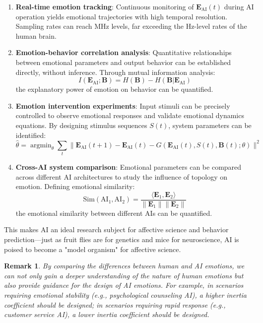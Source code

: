 \documentclass[12pt,a4paper]{article}
\theoremstyle{plain}
\newtheorem{remark}{Remark}[section]
\newcommand{\ve}[1]{\bm{#1}}                    %
\newcommand{\Evec}{\ve{E}}                        %
\newcommand{\Bvec}{\ve{B}}                        %
\DeclareMathOperator*{\argmin}{argmin}
\begin{document}
\begin{enumerate}
    \item \textbf{Real-time emotion tracking}: Continuous monitoring of $\Evec_{\text{AI}}(t)$ during AI operation yields emotional trajectories with high temporal resolution. Sampling rates can reach MHz levels, far exceeding the Hz-level rates of the human brain.
    \item \textbf{Emotion-behavior correlation analysis}: Quantitative relationships between emotional parameters and output behavior can be established directly, without inference. Through mutual information analysis:
    \begin{equation}
    I(\Evec_{\text{AI}}; \Bvec) = H(\Bvec) - H(\Bvec | \Evec_{\text{AI}})
    \end{equation}
    the explanatory power of emotion on behavior can be quantified.
    \item \textbf{Emotion intervention experiments}: Input stimuli can be precisely controlled to observe emotional responses and validate emotional dynamics equations. By designing stimulus sequences $S(t)$, system parameters can be identified:
    \begin{equation}
    \hat{\theta} = \argmin_{\theta} \sum_t \| \Evec_{\text{AI}}(t+1) - \Evec_{\text{AI}}(t) - G(\Evec_{\text{AI}}(t), S(t), \Bvec(t); \theta) \|^2
    \end{equation}
    \item \textbf{Cross-AI system comparison}: Emotional parameters can be compared across different AI architectures to study the influence of topology on emotion. Defining emotional similarity:
    \begin{equation}
    \text{Sim}(\text{AI}_1, \text{AI}_2) = \frac{\langle \Evec_1, \Evec_2 \rangle}{\|\Evec_1\| \|\Evec_2\|}
    \end{equation}
    the emotional similarity between different AIs can be quantified.
\end{enumerate}

This makes AI an ideal research subject for affective science and behavior prediction—just as fruit flies are for genetics and mice for neuroscience, AI is poised to become a "model organism" for affective science.

\begin{remark}
By comparing the differences between human and AI emotions, we can not only gain a deeper understanding of the nature of human emotions but also provide guidance for the design of AI emotions. For example, in scenarios requiring emotional stability (e.g., psychological counseling AI), a higher inertia coefficient should be designed; in scenarios requiring rapid response (e.g., customer service AI), a lower inertia coefficient should be designed.
\end{remark}
\end{document}
